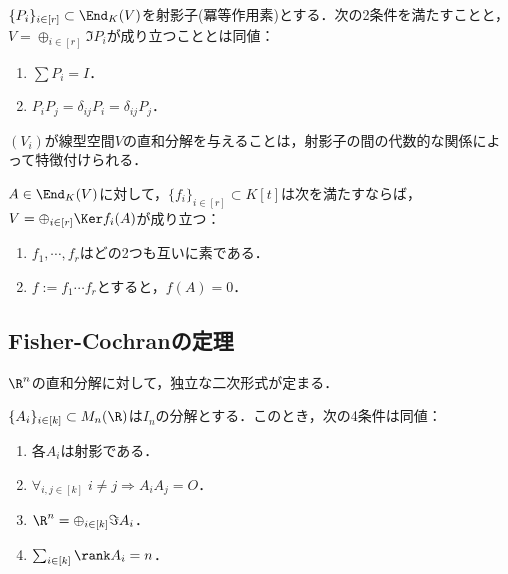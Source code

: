 \documentclass[uplatex, dvipdfmx]{jsreport}
\begin{document}
\begin{proposition}[空間の直和分解の射影子による特徴付け]
    $\{P_i\}_{i\in[r]}\subset\End_K(V)$を射影子(冪等作用素)とする．次の2条件を満たすことと，$V=\oplus_{i\in[r]}\Im P_i$が成り立つこととは同値：
    \begin{enumerate}
        \item $\sum P_i=I$．
        \item $P_iP_j=\delta_{ij}P_i=\delta_{ij}P_j$．
    \end{enumerate}
\end{proposition}
\begin{remarks}
    $(V_i)$が線型空間$V$の直和分解を与えることは，射影子の間の代数的な関係によって特徴付けられる．
\end{remarks}

\begin{theorem}
    $A\in\End_K(V)$に対して，$\{f_i\}_{i\in[r]}\subset K[t]$は次を満たすならば，$V=\oplus_{i\in[r]}\Ker f_i(A)$が成り立つ：
    \begin{enumerate}
        \item $f_1,\cdots,f_r$はどの2つも互いに素である．
        \item $f:=f_1\cdots f_r$とすると，$f(A)=0$．
    \end{enumerate}
\end{theorem}

\subsection{Fisher-Cochranの定理}

\begin{tcolorbox}[colframe=ForestGreen, colback=ForestGreen!10!white,breakable,colbacktitle=ForestGreen!40!white,coltitle=black,fonttitle=\bfseries\sffamily,
title=]
    $\R^n$の直和分解に対して，独立な二次形式が定まる．
\end{tcolorbox}

\begin{theorem}
    $\{A_i\}_{i\in[k]}\subset M_n(\R)$は$I_n$の分解とする．このとき，次の4条件は同値：
    \begin{enumerate}
        \item 各$A_i$は射影である．
        \item $\forall_{i,j\in[k]}\;i\ne j\Rightarrow A_iA_j=O$．
        \item $\R^n=\oplus_{i\in[k]}\Im A_i$．
        \item $\sum_{i\in[k]}\rank A_i=n$．
    \end{enumerate}
\end{theorem}
\end{document}
